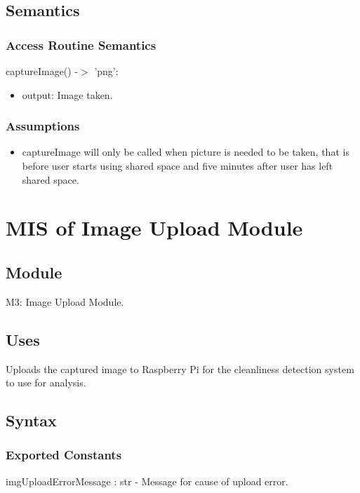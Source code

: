 \documentclass[12pt, titlepage]{article}
\begin{document}
\subsection{Semantics}

\subsubsection{Access Routine Semantics}

\noindent captureImage() -$>$ 'png':
\begin{itemize}
\item output: Image taken.
\end{itemize}

\subsubsection{Assumptions}
\begin{itemize}
\item captureImage will only be called when picture is needed to be taken, that is before user starts using shared space and five minutes after user has left shared space.
\end{itemize}


\newpage


\section{MIS of Image Upload Module} \label{Module} 

\subsection{Module}

M3: Image Upload Module.

\subsection{Uses}
Uploads the captured image to Raspberry Pi for the cleanliness detection system to use for analysis.

\subsection{Syntax}

\subsubsection{Exported Constants}
imgUploadErrorMessage : str - Message for cause of upload error.
\end{document}

